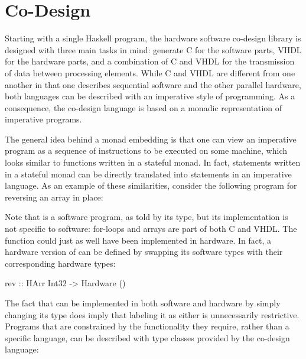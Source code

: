 \documentclass[../paper.tex]{subfiles}
\begin{document}
\chapter{Co-Design}
\label{codesign}

Starting with a single Haskell program, the hardware software co-design library is designed with three main tasks in mind: generate C for the software parts, VHDL for the hardware parts, and a combination of C and VHDL for the transmission of data between processing elements. While C and VHDL are different from one another in that one describes sequential software and the other parallel hardware, both languages can be described with an imperative style of programming. As a consequence, the co-design language is based on a monadic representation of imperative programs.

The general idea behind a monad embedding is that one can view an imperative program as a sequence of instructions to be executed on some machine, which looks similar to functions written in a stateful monad. In fact, statements written in a stateful monad can be directly translated into statements in an imperative language. As an example of these similarities, consider the following program for reversing an array in place:


Note that  is a software program, as told by its type, but its implementation is not specific to software: for-loops and arrays are part of both C and VHDL. The function could just as well have been implemented in hardware. In fact, a hardware version of  can be defined by swapping its software types with their corresponding hardware types:

\begin{code}
rev :: HArr Int32 -> Hardware ()
\end{code}

The fact that  can be implemented in both software and hardware by simply changing its type does imply that labeling it as either is unnecessarily restrictive. Programs that are constrained by the functionality they require, rather than a specific language, can be described with type classes provided by the co-design language:
\end{document}
